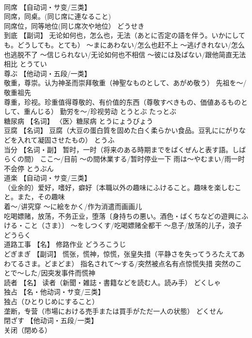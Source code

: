 \documentclass[8pt]{extreport}
\begin{document}
\begin{CJK}{UTF8}{min}
\\	同席	【自动词・サ变/三类】 
\\	同席，同桌。(同じ席に連なること) 
\\	同席位，同等地位(同じ席次や地位）	どうせき	
\\	到底	【副词】 无论如何也，怎么也，无法（あとに否定の語を伴う。いかにしても。どうしても。とても） ～まにあわない/怎么也赶不上 ～逃げきれない/怎么也逃脱不了 ～信じられない/无论如何也不相信 ～彼には及ばない/跟他简直无法相比	とうてい	
\\	尊ぶ	【他动词・五段/一类】 
\\	敬重，尊崇。认为神圣而崇拜敬重（神聖なものとして、あがめ敬う） 先祖を～/敬重祖先 
\\	尊重，珍视。珍重值得尊敬的、有价值的东西（尊敬すべきもの、価値あるものとして、重んじる） 勤労を～/珍视劳动	とうとぶ たっとぶ	
\\	糖尿病	【名词】 〈医〉糖尿病	とうにょうびょう	
\\	豆腐	【名词】 豆腐（大豆の蛋白質を固めた白く柔らかい食品。豆乳ににがりなどを入れて凝固させたもの）	とうふ	
\\	当分	【名词・副】 暂时，一时（将来のある時期までをばくぜんと表す語。しばらくの間） ここ～/目前 ～の間休業する/暂时停业一下 雨は～やむまい/雨一时不会停	とうぶん	
\\	道楽	【自动词・サ变/三类】 
\\	（业余的）爱好，嗜好，癖好〔本職以外の趣味にふけること。趣味を楽しむこと。また，その趣味 
\\	着～/讲究穿 ～に絵をかく/作为消遣而画画儿 
\\	吃喝嫖赌，放荡，不务正业，堕落〔身持ちの悪い。酒色・ばくちなどの遊興にふける・こと（さま）〕 ～をしつくす/吃喝嫖赌全都干 ～息子/放荡的儿子，浪子	どうらく	
\\	道路工事	【名】 修路作业	どうろこうじ	
\\	どぎまぎ	【副词】 慌张，慌神，惊慌，张皇失措（平静さを失ってうろたえてあわてるさま。どまどま） 指名されて～する/突然被点名有点惊慌失措 突然のことで～した/因突发事件而慌神		
\\	読者	【名】 读者（新聞・雑誌・書籍などを読む人。読み手）	どくしゃ	
\\	独占	【名・他动词・サ变/三类】 
\\	独占（ひとりじめにすること） 
\\	垄断，专营（市場における売手または買手がただ一人の状態）	どくせん	
\\	閉ざす	【他动词・五段/一类】 
\\	关闭（閉める） 

\end{CJK}
\end{document}
